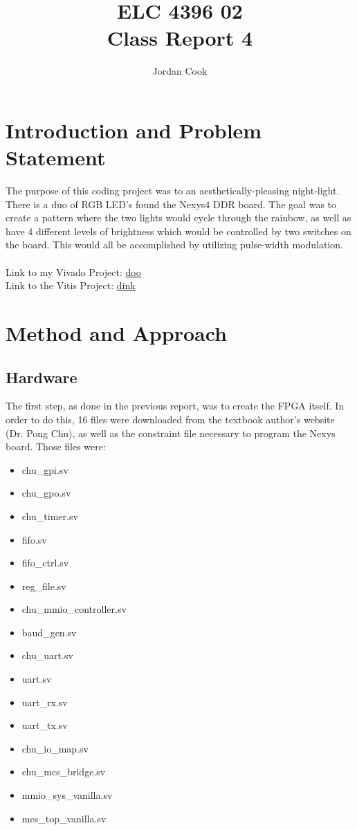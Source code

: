 \documentclass[11pt]{article}
\begin{document}
\title{ELC 4396 02 \\ Class Report 4}
\author{Jordan Cook}

\maketitle


\section{Introduction and Problem Statement} 

\quad The purpose of this coding project was to an aesthetically-pleasing night-light. There is a duo of RGB LED's found the Nexys4 DDR board. The goal was to create a pattern where the two lights would cycle through the rainbow, as well as have 4 different levels of brightness which would be controlled by two switches on the board. This would all be accomplished by utilizing pulse-width modulation.
\\\\ Link to my Vivado Project: \url{doo}
\\ Link to the Vitis Project: \url{dink}

\section{Method and Approach}

\subsection{Hardware}

\quad The first step, as done in the previous report, was to create the FPGA itself. In order to do this, 16 files were downloaded from the textbook author's website (Dr. Pong Chu), as well as the constraint file necessary to program the Nexys board. Those files were: 

\begin{multicols}{2}
\begin{itemize}
	\item chu\_gpi.sv
	\item chu\_gpo.sv 
	\item chu\_timer.sv 
	\item fifo.sv 
	\item fifo\_ctrl.sv 
	\item reg\_file.sv
	\item chu\_mmio\_controller.sv 
	\item baud\_gen.sv 
	\item chu\_uart.sv 
	\item uart.sv 
	\item uart\_rx.sv 
	\item uart\_tx.sv 
	\item chu\_io\_map.sv 
	\item chu\_mcs\_bridge.sv 
	\item mmio\_sys\_vanilla.sv 
	\item mcs\_top\_vanilla.sv
\end{itemize}
\end{multicols} 
\end{document}
